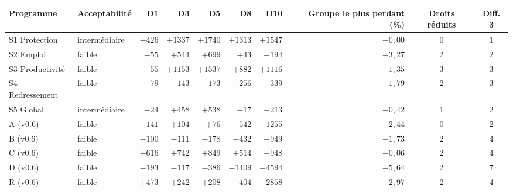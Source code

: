 \begin{tabular}{llrrrrrrcc}\toprule Programme & Acceptabilité & D1 & D3 & D5 & D8 & D10 & Groupe le plus perdant (\%) & Droits réduits & Diff. 3\\ \midrule
S1 Protection & intermédiaire & $+426$ & $+1337$ & $+1740$ & $+1313$ & $+1547$ & $-0{,}00$ & 0 & 1\\
S2 Emploi & faible & $-55$ & $+544$ & $+699$ & $+43$ & $-194$ & $-3{,}27$ & 2 & 2\\
S3 Productivité & faible & $-55$ & $+1153$ & $+1537$ & $+882$ & $+1116$ & $-1{,}35$ & 3 & 3\\
S4 Redressement & faible & $-79$ & $-143$ & $-173$ & $-256$ & $-339$ & $-1{,}79$ & 2 & 3\\
S5 Global & intermédiaire & $-24$ & $+458$ & $+538$ & $-17$ & $-213$ & $-0{,}42$ & 1 & 2\\
A (v0.6) & faible & $-141$ & $+104$ & $+76$ & $-542$ & $-1255$ & $-2{,}44$ & 0 & 2\\
B (v0.6) & faible & $-100$ & $-111$ & $-178$ & $-432$ & $-949$ & $-1{,}73$ & 2 & 4\\
C (v0.6) & faible & $+616$ & $+742$ & $+849$ & $+514$ & $-948$ & $-0{,}06$ & 2 & 4\\
D (v0.6) & faible & $-193$ & $-117$ & $-386$ & $-1409$ & $-4594$ & $-5{,}64$ & 2 & 7\\
R (v0.6) & faible & $+473$ & $+242$ & $+208$ & $-404$ & $-2858$ & $-2{,}97$ & 2 & 4\\\bottomrule\end{tabular}